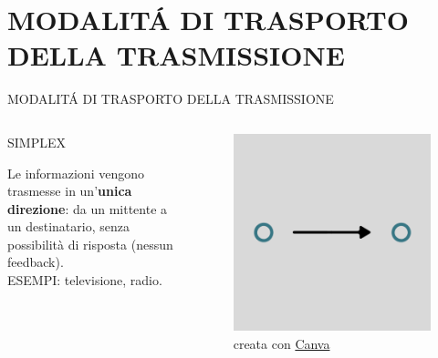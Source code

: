 \documentclass[aspectratio=1610]{beamer}
\begin{document}
\section{MODALIT\'A DI TRASPORTO DELLA TRASMISSIONE}

\begin{frame}{MODALIT\'A DI TRASPORTO DELLA TRASMISSIONE}
    \begin{columns}
        \begin{alertblock}{SIMPLEX}
            \begin{minipage}{0.96\linewidth}
                \justifying
                Le informazioni vengono trasmesse in un'\textbf{unica direzione}: da un mittente a un 
                destinatario, senza possibilità di risposta (nessun feedback).\\
                ESEMPI: televisione, radio.
            \end{minipage}
        \end{alertblock}
           \begin{figure}
               \includegraphics[width=\linewidth]{img/simplex.png}
               \caption{{creata con \href{https://www.canva.com}{Canva}}}
           \end{figure}
    \end{columns}
\end{frame}
\end{document}
